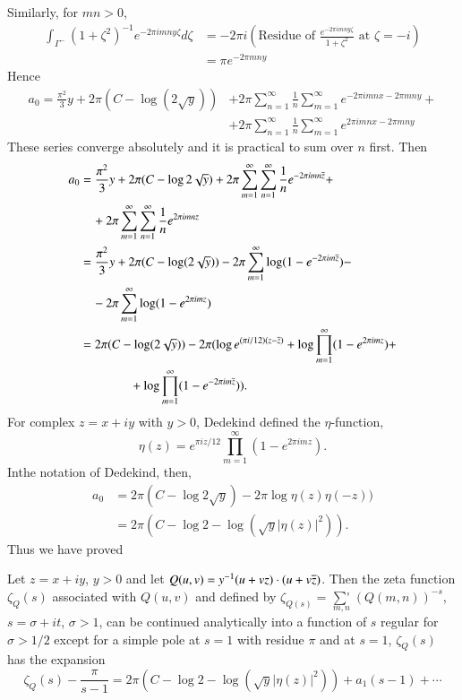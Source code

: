 Similarly, for $mn>0$,
\begin{align*}
\int_{\Gamma^{-}}(1+\zeta^{2})^{-1}e^{-2\pi imny\zeta}d\zeta &= -2\pi
i\left(\text{Residue of } \frac{e^{-2\pi
    imny\zeta}}{1+\zeta^{2}}\text{ at } \zeta=-i\right)\\
&= \pi e^{-2\pi mny}
\end{align*}
Hence
\begin{align*}
a_{0}=\frac{\pi^{2}}{3}y+2\pi(C-\log(2\sqrt{y})) &+ 2\pi
\sum^{\infty}_{n=1}\frac{1}{n}\sum^{\infty}_{m=1}e^{-2\pi imnx-2\pi
  mny}+\\
&+ 2\pi \sum^{\infty}_{n=1}\frac{1}{n}\sum^{\infty}_{m=1}e^{2\pi
  imnx-2\pi mny}
\end{align*}
These series converge absolutely and it is practical to sum over $n$
first. Then 
\begin{align*}
a_{0} &= \frac{\pi^{2}}{3}y+2\pi (C-\log 2\sqrt{y})+2\pi
\sum^{\infty}_{m=1}\sum^{\infty}_{n=1}\frac{1}{n}e^{-2\pi
  imn\overline{z}}+\\
&\quad +2\pi \sum^{\infty}_{m=1}\sum^{\infty}_{n=1}\frac{1}{n}e^{2\pi
  imnz}\\
&=
\frac{\pi^{2}}{3}y+2\pi(C-\log(2\sqrt{y}))-2\pi\sum^{\infty}_{m=1}\log(1-e^{-2\pi
  im\overline{z}})-\\
&\quad -2\pi\sum^{\infty}_{m=1}\log(1-e^{2\pi imz})\\
&= 2\pi(C-\log(2\sqrt{y}))-2\pi(\log e^{(\pi
  i/12)(z-\overline{z})}+\log\prod^{\infty}_{m=1}(1-e^{2\pi imz})+\\
&\qquad\qquad +\log\prod^{\infty}_{m=1}(1-e^{-2\pi im\overline{z}})).
\end{align*}
For complex $z=x+iy$ with $y>0$, Dedekind defined the $\eta$-function,
$$
\eta(z)=e^{\pi iz/12}\prod^{\infty}_{m=1}(1-e^{2\pi imz}).
$$
In\pageoriginale the notation of Dedekind, then,
\begin{align*}
a_{0} &= 2\pi(C-\log 2\sqrt{y})-2\pi \log\eta(z)\eta(-z))\\
&= 2\pi(C-\log 2-\log (\sqrt{y}|\eta(z)|^{2})).
\end{align*}
Thus we have proved

\begin{thm}\label{chap1:thm1}
Let $z=x+iy$, $y>0$ and let $Q(u,v)=y^{-1}(u+vz)\cdot
(u+v\overline{z})$. Then the zeta function $\zeta_{Q}(s)$ associated with
$Q(u,v)$ and defined by
$\zeta_{Q(s)}=\mathop{{\sum}'}\limits_{m,n}(Q(m,n))^{-s}$,
$s=\sigma+it$, $\sigma>1$, can be continued analytically into a
function of $s$ regular for $\sigma>1/2$ except for a simple pole at
$s=1$ with residue $\pi$ and at $s=1$, $\zeta_{Q}(s)$ has the
expansion
$$
\zeta_{Q}(s)-\frac{\pi}{s-1}=2\pi(C-\log
2-\log(\sqrt{y}|\eta(z)|^{2}))+a_{1}(s-1)+\cdots 
$$
\end{thm}

